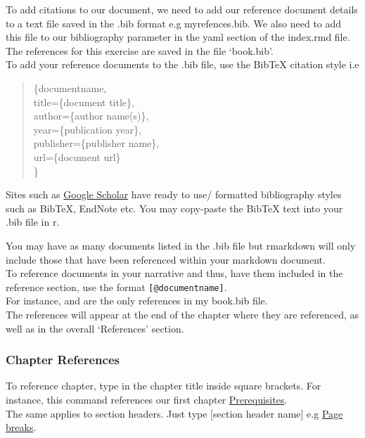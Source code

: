 \documentclass[
]{book}
\begin{document}
To add citations to our document, we need to add our reference document details to a text file saved in the .bib format e.g myrefences.bib. We also need to add this file to our bibliography parameter in the yaml section of the index.rmd file.\\
The references for this exercise are saved in the file `book.bib'.\\
To add your reference documents to the .bib file, use the BibTeX citation style i.e

\begin{quote}
\citet{documentype}\{documentname,\\
title=\{document title\},\\
author=\{author name(s)\},\\
year=\{publication year\},\\
publisher=\{publisher name\},\\
url=\{document url\}\\
\}
\end{quote}

Sites such as \href{https://scholar.google.com/}{Google Scholar} have ready to use/ formatted bibliography styles such as BibTeX, EndNote etc. You may copy-paste the BibTeX text into your .bib file in r.

You may have as many documents listed in the .bib file but rmarkdown will only include those that have been referenced within your markdown document.\\
To reference documents in your narrative and thus, have them included in the reference section, use the format \texttt{{[}@documentname{]}}.\\
For instance, \citep{xie2015} and \citep{team2013r} are the only references in my book.bib file.\\
The references will appear at the end of the chapter where they are referenced, as well as in the overall `References' section.

\hypertarget{chapter-references}{%
\subsubsection{Chapter References}\label{chapter-references}}

To reference chapter, type in the chapter title inside square brackets. For instance, this command references our first chapter \protect\hyperlink{prerequisites}{Prerequisites}.\\
The same applies to section headers. Just type {[}section header name{]} e.g \protect\hyperlink{page-breaks}{Page breaks}.
\end{document}
